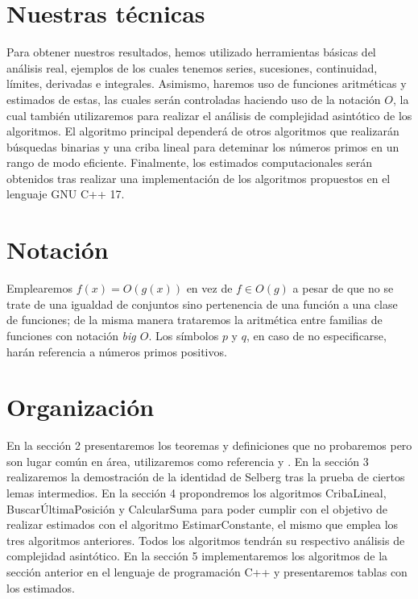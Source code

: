 \section{Nuestras t\'ecnicas}
Para obtener nuestros resultados,
hemos utilizado herramientas b\'asicas del an\'alisis real,
ejemplos de los cuales tenemos series, sucesiones, continuidad,
l\'imites, derivadas e integrales.
Asimismo, haremos uso de funciones aritm\'eticas
y estimados de estas,
las cuales ser\'an controladas haciendo uso de la notaci\'on \(O\),
la cual tambi\'en utilizaremos para realizar el an\'alisis de complejidad
asint\'otico de los algoritmos.
El algoritmo principal depender\'a de otros algoritmos que realizar\'an
b\'usquedas binarias y una criba lineal para deteminar
los n\'umeros primos en un rango de modo eficiente.
Finalmente, los estimados computacionales ser\'an obtenidos tras realizar una
implementaci\'on de los algoritmos propuestos en el lenguaje GNU C++ 17.

\section{Notaci\'on}
Emplearemos \(f(x) = O(g(x))\) en vez de \(f \in O(g)\)
a pesar de que no se trate de una igualdad de conjuntos sino
pertenencia de una funci\'on a una clase de funciones; 
de la misma manera
trataremos la aritm\'etica entre familias de funciones
con notaci\'on \textit{big \(O\)}.
Los s\'imbolos \(p\) y \(q\), en caso de no especificarse,
har\'an referencia a n\'umeros primos positivos.

\section{Organizaci\'on}
En la secci\'on 2 presentaremos los teoremas y definiciones que no probaremos
pero  son lugar com\'un en \'area,
utilizaremos como referencia \cite{Apostol1976} y \cite{CLRS2009}.
En la secci\'on 3 realizaremos la demostraci\'on de la identidad de Selberg
tras la prueba de ciertos lemas intermedios.
En la secci\'on 4 propondremos los algoritmos CribaLineal,
Buscar\'UltimaPosici\'on y CalcularSuma para poder cumplir con
el objetivo de realizar estimados con el algoritmo EstimarConstante,
el mismo que emplea los tres algoritmos anteriores. 
Todos los algoritmos tendr\'an su respectivo an\'alisis de complejidad asint\'otico.
En la secci\'on 5 implementaremos los algoritmos de la secci\'on anterior
en el lenguaje de programaci\'on C++ y presentaremos tablas con los estimados.
